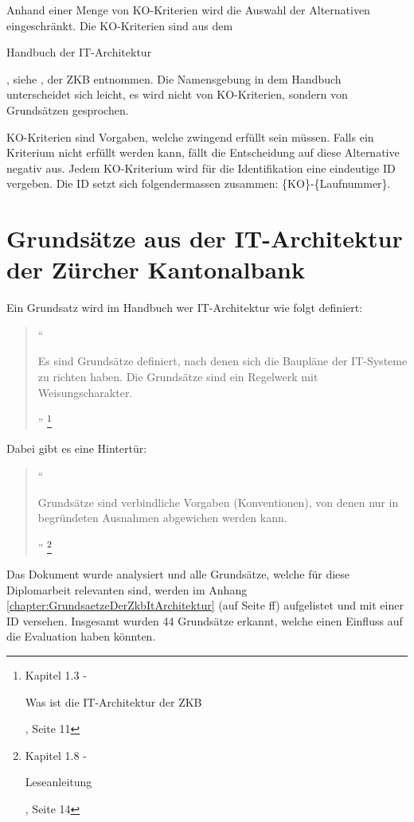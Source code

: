   Anhand einer Menge von KO-Kriterien wird die Auswahl der Alternativen
  eingeschränkt. Die KO-Kriterien sind aus dem \begin{itshape}Handbuch der
  IT-Architektur\end{itshape}, siehe \cite{ZkbHandbuchDerItArchitektur}, der
  \ac{ZKB} entnommen. Die Namensgebung in dem Handbuch unterscheidet sich
  leicht, es wird nicht von KO-Kriterien, sondern von Grundsätzen gesprochen.
  
  KO-Kriterien sind Vorgaben, welche zwingend erfüllt sein müssen. Falls ein
  Kriterium nicht erfüllt werden kann, fällt die Entscheidung auf diese
  Alternative negativ aus. Jedem KO-Kriterium wird für die Identifikation eine
  eindeutige ID vergeben. Die ID setzt sich folgendermassen zusammen: 
  \{KO\}-\{Laufnummer\}.

  \section{Grundsätze aus der IT-Architektur der Zürcher Kantonalbank}
  
  Ein Grundsatz wird im Handbuch wer IT-Architektur wie folgt definiert:

  \begin{quote}
  ``\begin{itshape}Es sind Grundsätze definiert, nach denen sich die Baupläne
  der IT-Systeme zu richten haben. Die Grundsätze sind ein Regelwerk mit
  Weisungscharakter.\end{itshape}''
  \footnote{\cite{ZkbHandbuchDerItArchitektur} Kapitel 1.3 - \begin{itshape}Was
  ist die IT-Architektur der ZKB\end{itshape}, Seite 11}
  \end{quote}

  Dabei gibt es eine Hintertür:

  \begin{quote}
  ``\begin{itshape}Grundsätze sind verbindliche Vorgaben (Konventionen), von
  denen nur in begründeten Ausnahmen abgewichen werden kann.\end{itshape}''
  \footnote{\cite{ZkbHandbuchDerItArchitektur} Kapitel 1.8 -
  \begin{itshape}Leseanleitung\end{itshape}, Seite 14}
  \end{quote}

  Das Dokument wurde analysiert und alle Grundsätze, welche für diese
  Diplomarbeit relevanten sind, werden im Anhang
  \ref{chapter:GrundsaetzeDerZkbItArchitektur}
   (auf Seite 
  \pageref{chapter:GrundsaetzeDerZkbItArchitektur}ff) aufgelistet und mit einer
  ID versehen. Insgesamt wurden 44 Grundsätze erkannt, welche einen Einfluss
  auf die Evaluation haben könnten.
  
